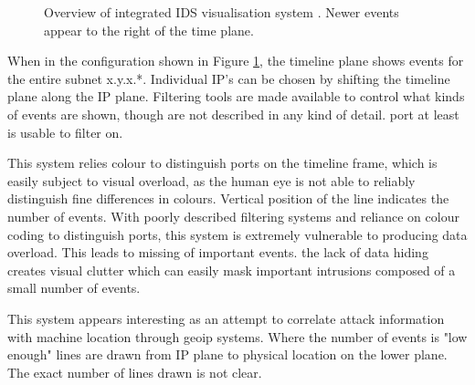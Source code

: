\begin{figure}[tbh]
\caption{\protect\label{integrated}Overview of integrated IDS visualisation system \cite{mukosaka2007integrated}. Newer events appear to the right of the time plane.}
\end{figure}

When in the configuration shown in Figure \ref{integrated}, the timeline plane shows events for the entire subnet x.y.x.*. Individual IP's can be chosen by shifting the timeline plane along the IP plane.
Filtering tools are made available to control what kinds of events are shown, though are not described in any kind of detail. port at least is usable to filter on. 

This system relies colour to distinguish ports on the timeline frame, which is easily subject to visual overload, as the human eye is not able to reliably distinguish fine differences in colours. Vertical position of the line indicates the number of events. With poorly described filtering systems and reliance on colour coding to distinguish ports, this system is extremely vulnerable to producing data overload. This leads to missing of important events. the lack of data hiding creates visual clutter which can easily mask important intrusions composed of a small number of events. 

This system appears interesting as an attempt to correlate attack information with machine location through geoip systems. Where the number of events is "low enough" lines are drawn from IP plane to physical location on the lower plane. The exact number of lines drawn is not clear. 

